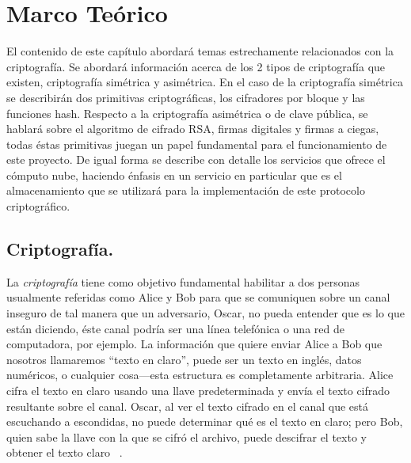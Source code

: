 \chapter{Marco Teórico}
El contenido de este capítulo abordará temas estrechamente relacionados con la criptograf\'ia. Se abordará información acerca de los 2 tipos de criptografía que existen, criptograf\'ia sim\'etrica y asim\'etrica. En el caso de la criptograf\'ia sim\'etrica se describir\'an dos primitivas criptogr\'aficas, los cifradores por bloque y las funciones hash. 
Respecto a la criptograf\'ia asim\'etrica o de clave p\'ublica, se hablar\'a sobre el algoritmo de cifrado RSA, firmas digitales y firmas a ciegas, todas \'estas primitivas juegan un papel fundamental para el funcionamiento de este proyecto. De igual forma se describe con detalle los servicios que ofrece el cómputo nube, haciendo énfasis en un servicio en particular que es el almacenamiento que se utilizará para la implementación de este protocolo criptográfico. 







\section{Criptografía. }

La \textit{ criptografía } tiene como objetivo fundamental habilitar a dos personas usualmente referidas como Alice y Bob para que se comuniquen sobre un canal inseguro de tal manera que un adversario, Oscar, no pueda entender que es lo que están diciendo, éste canal podría ser una línea telefónica o una red de computadora, por ejemplo. La información que quiere enviar Alice a Bob que nosotros llamaremos “texto en claro”, puede ser un texto en inglés, datos numéricos, o cualquier cosa---esta estructura es completamente arbitraria. Alice cifra el texto en claro usando una llave predeterminada y envía el texto cifrado resultante sobre el canal. Oscar, al ver el texto cifrado en el canal que está escuchando a escondidas, no puede determinar qué es el texto en claro; pero Bob, quien sabe la llave con la que se cifró el archivo, puede descifrar el texto y obtener el texto claro ~\cite{stinson}.\\

